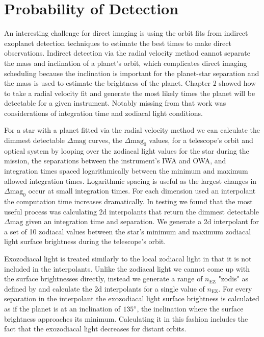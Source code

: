 
\section{Probability of Detection} %
\label{section:impact_on_pdet}

An interesting challenge for direct imaging is using the orbit fits from indirect
exoplanet detection techniques to estimate the best times to make direct
observations. Indirect detection via the radial velocity method cannot separate
the mass and inclination of a planet's orbit, which complicates direct imaging
scheduling because the inclination is important for the planet-star separation
and the mass is used to estimate the brightness of the planet. Chapter 2 showed
how to take a radial velocity fit and generate the most likely times the planet
will be detectable for a given instrument. Notably missing from that work was
considerations of integration time and zodiacal light conditions.

For a star with a planet fitted via the radial velocity method we can calculate
the dimmest detectable $\Delta\textrm{mag}$ curves, the $\Delta\textrm{mag}_0$
values, for a telescope's orbit and optical system by looping over the zodiacal
light values for the star during the mission, the separations between the
instrument's IWA and OWA, and integration times spaced logarithmically between
the minimum and maximum allowed integration times. Logarithmic spacing is
useful as the largest changes in $\Delta\textrm{mag}_0$ occur at small
integration times. For each dimension used an interpolant the computation time
increases dramatically. In testing we found that the most useful process was
calculating 2d interpolants that return the dimmest detectable
$\Delta\textrm{mag}$ given an integration time and separation. We generate a 2d
interpolant for a set of 10 zodiacal values between the star's minimum and
maximum zodiacal light surface brightness during the telescope's orbit. 

Exozodiacal light is treated similarly to the local zodiacal light in that
it is not included in the interpolants. Unlike the zodiacal light we cannot
come up with the surface brightnesses directly, instead we generate a range of
$n_\textrm{EZ}$ "zodis" as defined by
\citet{starkMaximizingExoEarthCandidate2014} and calculate the 2d interpolants
for a single value of $n_\textrm{EZ}$. For every separation in the
interpolant the exozodiacal light surface brightness is calculated as if the
planet is at an inclination of $135\degree$, the inclination where the surface
brightness approaches its minimum. Calculating it in this fashion includes the
fact that the exozodiacal light decreases for distant orbits.

